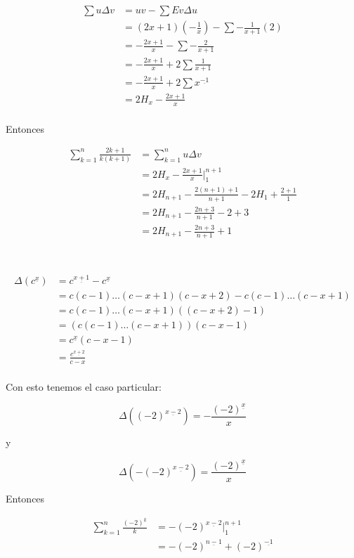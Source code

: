\documentclass{article}
\begin{document}

\begin{align*}
\sum u \Delta v & = uv - \sum Ev \Delta u \\
 & = (2x+1)(-\frac{1}{x}) - \sum -\frac{1}{x+1}(2) \\
 & = -\frac{2x+1}{x} - \sum -\frac{2}{x+1} \\
 & = -\frac{2x+1}{x} + 2\sum \frac{1}{x+1} \\
 & = -\frac{2x+1}{x} + 2\sum x^{\underline{-1}} \\
 & = 2H_x - \frac{2x+1}{x} \\
\end{align*}

Entonces

\begin{align*}
\sum_{k=1}^n \frac{2k+1}{k(k+1)} & = \sum_{k=1}^n u \Delta v \\
             & = 2H_x -\frac{2x+1}{x} \Big |_{1}^{n+1} \\
             & = 2H_{n+1} -\frac{2(n+1)+1}{n+1} - 2H_1 + \frac{2+1}{1} \\
             & = 2H_{n+1} -\frac{2n+3}{n+1} - 2 + 3 \\
             & = 2H_{n+1} -\frac{2n+3}{n+1} + 1 \\
\end{align*}

\section{} %

\begin{align*}
\Delta(c^{\underline{x}}) & = c^{\underline{x+1}} - c^{\underline{x}} \\
  & = c(c-1) \ldots (c-x+1)(c-x+2) - c(c-1) \ldots (c-x+1) \\
  & = c(c-1) \ldots (c-x+1)((c-x+2)-1) \\
  & = (c(c-1) \ldots (c-x+1))(c-x-1) \\
  & = c^{\underline{x}}(c-x-1) \\
  & = \frac{c^{\underline{x+2}}}{c-x} \\
\end{align*}

Con esto tenemos el caso particular:

$$
\Delta((-2)^{\underline{x-2}}) = -\frac{(-2)^{\underline{x}}}{x}
$$

y

$$
\Delta(-(-2)^{\underline{x-2}}) = \frac{(-2)^{\underline{x}}}{x}
$$

Entonces

\begin{align*}
\sum_{k=1}^n \frac{(-2)^{\underline{k}}}{k} & = -(-2)^{\underline{x-2}} \Big |_{1}^{n+1} \\
  & = - (-2)^{\underline{n-1}} + (-2)^{\underline{-1}} \\
\end{align*}

\section{} %
\end{document}
